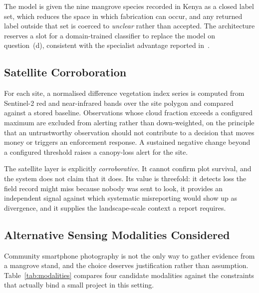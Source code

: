 \documentclass[10pt,twocolumn,a4paper]{article}
\begin{document}
The model is given the nine mangrove species recorded in Kenya as a closed
label set, which reduces the space in which fabrication can occur, and any
returned label outside that set is coerced to \emph{unclear} rather than
accepted. The architecture reserves a slot for a domain-trained classifier to
replace the model on question~(d), consistent with the specialist advantage
reported in~\cite{zhou2026}.

\subsection{Satellite Corroboration}

For each site, a normalised difference vegetation index series is computed from
Sentinel-2 red and near-infrared bands over the site polygon and compared
against a stored baseline. Observations whose cloud fraction exceeds a
configured maximum are excluded from alerting rather than down-weighted, on the
principle that an untrustworthy observation should not contribute to a decision
that moves money or triggers an enforcement response. A sustained negative
change beyond a configured threshold raises a canopy-loss alert for the site.

The satellite layer is explicitly \emph{corroborative}. It cannot confirm plot
survival, and the system does not claim that it does. Its value is threefold: it
detects loss the field record might miss because nobody was sent to look, it
provides an independent signal against which systematic misreporting would show
up as divergence, and it supplies the landscape-scale context a report requires.

\subsection{Alternative Sensing Modalities Considered}

Community smartphone photography is not the only way to gather evidence from a
mangrove stand, and the choice deserves justification rather than assumption.
Table~\ref{tab:modalities} compares four candidate modalities against the
constraints that actually bind a small project in this setting.
\end{document}
